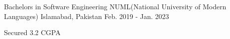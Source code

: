 

\begin{cventries}

  \cventry
    {Bachelors in Software Engineering} %
    {NUML(National University of Modern Languages)} %
    {Islamabad, Pakistan} %
    {Feb. 2019 - Jan. 2023} %
    {
      \begin{cvitems} %
        \item {Secured 3.2 CGPA}
      \end{cvitems}
    }

\end{cventries}
